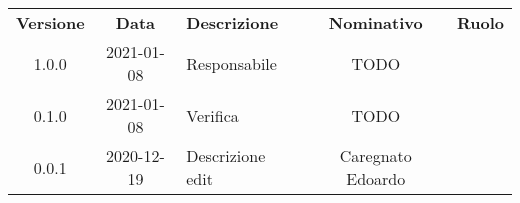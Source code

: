{
    \renewcommand{\arraystretch}{1.5}
    \centering
    \begin{longtable}{ c c  C{4cm}  c  c }
        \rowcolor{\primaryColor}
        \textcolor{\secondaryColor}{
        \textbf{Versione}}     & \textcolor{\secondaryColor}{\textbf{Data}}       & \textcolor{\secondaryColor}
        {\textbf{Descrizione}} & \textcolor{\secondaryColor}{\textbf{Nominativo}} & \textcolor{\secondaryColor}{\textbf{Ruolo}}                          \\


        1.0.0                  & 2021-01-08                                       & Responsabile                                & TODO & \responsabile{} \\
        0.1.0                  & 2021-01-08                                      & Verifica                                    & TODO & \verificatore{} \\
        0.0.1                  & 2020-12-19                                       & Descrizione edit                            & Caregnato Edoardo & \redattore{}    \\
    \end{longtable}
}